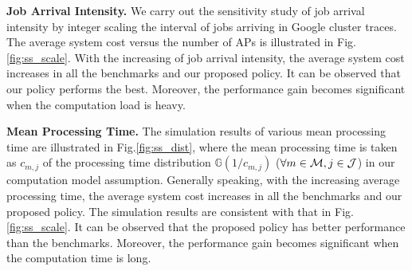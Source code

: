 \noindent\textbf{Job Arrival Intensity.}
We carry out the sensitivity study of job arrival intensity by integer scaling the interval of jobs arriving in Google cluster traces.
The average system cost versus the number of APs is illustrated in Fig.\ref{fig:ss_scale}.
With the increasing of job arrival intensity, the average system cost increases in all the benchmarks and our proposed policy.
It can be observed that our policy performs the best.
Moreover, the performance gain becomes significant when the computation load is heavy.

\noindent\textbf{Mean Processing Time.}
The simulation results of various mean processing time are illustrated in Fig.\ref{fig:ss_dist}, where the mean processing time is taken as $c_{m,j}$ of the processing time distribution $\mathbb{G}(1/c_{m,j})$ ($\forall m\in\mathcal{M},j\in\mathcal{J}$) in our computation model assumption.
Generally speaking, with the increasing average processing time, the average system cost increases in all the benchmarks and our proposed policy.
The simulation results are consistent with that in Fig.\ref{fig:ss_scale}.
It can be observed that the proposed policy has better performance than the benchmarks.
Moreover, the performance gain becomes significant when the computation time is long.


